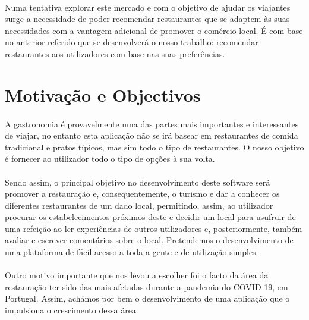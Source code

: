 \documentclass[a4paper,12pt]{scrreprt}
\begin{document}
	\paragraph{}
	Numa tentativa explorar este mercado e com o objetivo de ajudar os viajantes surge a necessidade de poder recomendar restaurantes que se adaptem às suas necessidades com a vantagem adicional de promover o comércio local. É com base no anterior referido que se desenvolverá o nosso trabalho: recomendar restaurantes aos utilizadores com base nas suas preferências.
\pagebreak
\section{Motivação e Objectivos}
\paragraph{}
            A gastronomia é provavelmente uma das partes mais importantes e interessantes de viajar, no entanto esta aplicação não se irá basear em restaurantes de comida tradicional e pratos típicos, mas sim todo o tipo de restaurantes. O nosso objetivo é fornecer ao utilizador todo o tipo de opções à sua volta.
            \paragraph{}
            Sendo assim, o principal objetivo no desenvolvimento deste software será promover a restauração e, consequentemente, o turismo e dar a conhecer os diferentes restaurantes de um dado local, permitindo, assim, ao utilizador procurar os estabelecimentos próximos deste e decidir um local para usufruir de uma refeição ao ler experiências de outros utilizadores e, posteriormente, também avaliar e escrever comentários sobre o local.
            Pretendemos o desenvolvimento de uma plataforma de fácil acesso a toda a gente e de utilização simples.
            \paragraph{}
            Outro motivo importante que nos levou a escolher foi o facto da área da restauração ter sido das mais afetadas durante a pandemia do COVID-19, em Portugal. Assim, achámos por bem o desenvolvimento de uma aplicação que o impulsiona o crescimento dessa área.
            \paragraph{}
\end{document}
